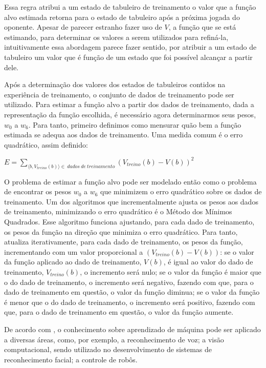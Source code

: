 Essa regra atribui a um estado de tabuleiro de treinamento o valor que a função alvo estimada retorna para o estado de tabuleiro após a próxima jogada do oponente. Apesar de parecer estranho fazer uso de $V$, a função que se está estimando, para determinar os valores a serem utilizados para refiná-la, intuitivamente essa abordagem parece fazer sentido, por atribuir a um estado de tabuleiro um valor que é função de um estado que foi possível alcançar a partir dele. 

Após a determinação dos valores dos estados de tabuleiros contidos na experiência de treinamento, o conjunto de dados de treinamento pode ser utilizado. Para estimar a função alvo a partir dos dados de treinamento, dada a representação da função escolhida, é necessário agora determinarmos seus pesos, $w_0$ a $w_6$. Para tanto, primeiro definimos como mensurar quão bem a função estimada se adequa aos dados de treinamento. Uma medida comum é o erro quadrático, assim definido:

$E = \sum\limits_{\langle b, V_{treino}(b) \rangle \in \ dados\ de\ treinamento} {(V_{treino}(b) - V(b))}^2$

O problema de estimar a função alvo pode ser modelado então como o problema de encontrar os pesos $w_0$ a $w_6$ que minimizem o erro quadrático sobre os dados de treinamento. Um dos algoritmos que incrementalmente ajusta os pesos aos dados de treinamento, minimizando o erro quadrático é o Método dos Mínimos Quadrados. Esse algoritmo funciona ajustando, para cada dado de treinamento, os pesos da função na direção que minimiza o erro quadrático. Para tanto, atualiza iterativamente, para cada dado de treinamento, os pesos da função, incrementando com um valor proporcional a $(V_{treino}(b) - V(b))$: se o valor da função aplicado ao dado de treinamento, $V(b)$, é igual ao valor do dado de treinamento, $V_{treino}(b)$, o incremento será nulo; se o valor da função é maior que o do dado de treinamento, o incremento será negativo, fazendo com que, para o dado de treinamento em questão, o valor da função diminua; se o valor da função é menor que o do dado de treinamento, o incremento será positivo, fazendo com que, para o dado de treinamento em questão, o valor da função aumente.



De acordo com \cite{Mitchell_discipline}, o conhecimento sobre aprendizado de máquina pode ser aplicado a diversas áreas, como, por exemplo, a reconhecimento de voz; a visão computacional, sendo utilizado no desenvolvimento de sistemas de reconhecimento facial; a controle de robôs.

\cite{ML_debt} 
\cite{ML_know}